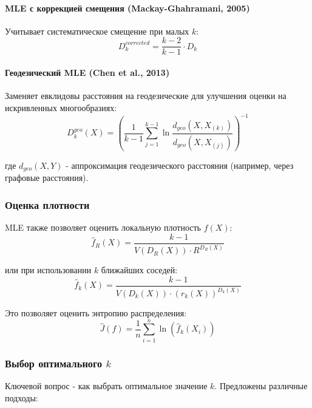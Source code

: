 \documentclass[a4paper,12pt]{article}
\begin{document}
\paragraph{MLE с коррекцией смещения (Mackay-Ghahramani, 2005)}

Учитывает систематическое смещение при малых $k$:
\begin{equation}
    D_k^{corrected} = \frac{k-2}{k-1} \cdot D_k
\end{equation}

\paragraph{Геодезический MLE (Chen et al., 2013)}

Заменяет евклидовы расстояния на геодезические для улучшения оценки на искривленных многообразиях:
\begin{equation}
    D_k^{geo}(X) = \left(\frac{1}{k-1} \sum_{j=1}^{k-1} \ln\frac{d_{geo}(X, X_{(k)})}{d_{geo}(X, X_{(j)})} \right)^{-1}
\end{equation}

где $d_{geo}(X, Y)$ - аппроксимация геодезического расстояния (например, через графовые расстояния).

\subsubsection{Оценка плотности}

MLE также позволяет оценить локальную плотность $f(X)$:
\begin{equation}
    \hat{f}_R(X) = \frac{k-1}{V(D_R(X)) \cdot R^{D_R(X)}}
\end{equation}

или при использовании $k$ ближайших соседей:
\begin{equation}
    \hat{f}_k(X) = \frac{k-1}{V(D_k(X)) \cdot (r_k(X))^{D_k(X)}}
\end{equation}

Это позволяет оценить энтропию распределения:
\begin{equation}
    \hat{J}(f) = \frac{1}{n} \sum_{i=1}^n \ln(\hat{f}_k(X_i))
\end{equation}

\subsubsection{Выбор оптимального $k$}

Ключевой вопрос - как выбрать оптимальное значение $k$. Предложены различные подходы:
\end{document}
